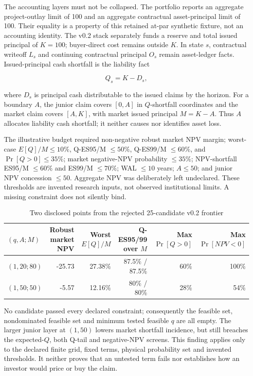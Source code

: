 \documentclass[11pt,a4paper]{article}
\begin{document}
The accounting layers must not be collapsed. The portfolio reports an aggregate project-outlay limit of 100 and an aggregate contractual asset-principal limit of 100. Their equality is a property of this retained at-par synthetic fixture, not an accounting identity. The v0.2 stack separately funds a reserve and total issued principal of \(K=100\); buyer-direct cost remains outside \(K\). In state \(s\), contractual writeoff \(L_s\) and continuing contractual principal \(O_s\) remain asset-ledger facts. Issued-principal cash shortfall is the liability fact

\[
Q_s=K-D_s,
\]

where \(D_s\) is principal cash distributable to the issued claims by the horizon. For a boundary \(A\), the junior claim covers \([0,A]\) in \(Q\)-shortfall coordinates and the market claim covers \([A,K]\), with market issued principal \(M=K-A\). Thus \(A\) allocates liability cash shortfall; it neither causes nor identifies asset loss.

The illustrative budget required non-negative robust market NPV margin; worst-case \(E[Q]/M\leq10\%\), Q-ES95/M \(\leq50\%\), Q-ES99/M \(\leq60\%\), and \(\Pr[Q>0]\leq35\%\); market negative-NPV probability \(\leq35\%\); NPV-shortfall ES95/M \(\leq60\%\) and ES99/M \(\leq70\%\); WAL \(\leq10\) years; \(A\leq50\); and junior NPV concession \(\leq50\). Aggregate NPV was deliberately left undeclared. These thresholds are invented research inputs, not observed institutional limits. A missing constraint does not silently bind.

\begin{table}[htbp]
\centering
\caption{Two disclosed points from the rejected 25-candidate v0.2 frontier}
\label{tab:v02frontier}
\small
\begin{tabularx}{\textwidth}{@{}P{0.12\textwidth}R R R R R@{}}
\toprule
\textbf{\((q,A;M)\)} & \textbf{Robust market NPV} & \textbf{Worst \(E[Q]/M\)} & \textbf{Q-ES95/99 over \(M\)} & \textbf{Max \(\Pr[Q>0]\)} & \textbf{Max \(\Pr[NPV<0]\)} \\
\midrule
\((1,20;80)\) & -25.73 & 27.38\% & 87.5\% / 87.5\% & 60\% & 100\% \\
\((1,50;50)\) & -5.57 & 12.16\% & 80\% / 80\% & 28\% & 54\% \\
\bottomrule
\end{tabularx}
\end{table}

No candidate passed every declared constraint; consequently the feasible set, nondominated feasible set and minimum tested feasible \(q\) are all empty. The larger junior layer at \((1,50)\) lowers market shortfall incidence, but still breaches the expected-\(Q\), both Q-tail and negative-NPV screens. This finding applies only to the declared finite grid, fixed terms, physical probability set and invented thresholds. It neither proves that an untested term fails nor establishes how an investor would price or buy the claim.
\end{document}
